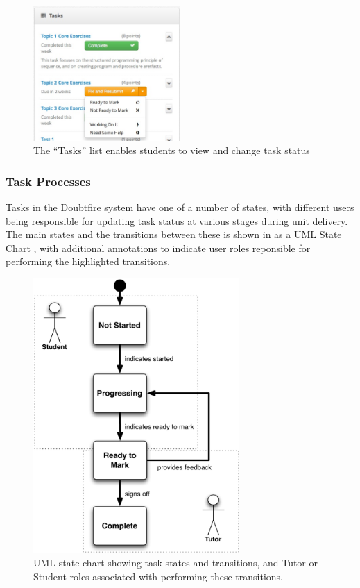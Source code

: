 \begin{figure}[thbp]
  \centering
  \includegraphics[width=0.5\textwidth]{StudentTasks}
  \caption{The ``Tasks'' list enables students to view and change task status}
  \label{fig:task_list}
\end{figure}


\subsubsection{Task Processes} %
\label{sub:task_processes}

Tasks in the Doubtfire system have one of a number of states, with different users being responsible for updating task status at various stages during unit delivery. The main states and the transitions between these is shown in  as a UML State Chart \cite{OMG:2011}, with additional annotations to indicate user roles reponsible for performing the highlighted transitions. 

\begin{figure}[thbp]
  \centering
  \includegraphics[width=0.7\textwidth]{BasicProcessStateChart}
  \caption{UML state chart showing task states and transitions, and Tutor or Student roles associated with performing these transitions.}
  \label{fig:basic_process_chart}
\end{figure}

